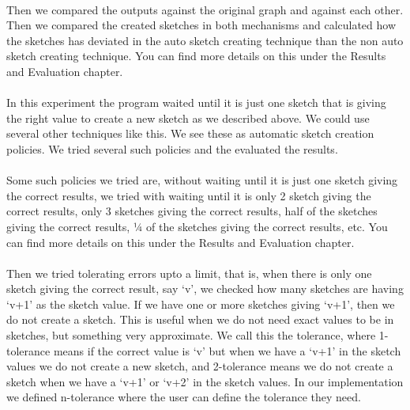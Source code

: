 \documentclass[12pt]{report}
\numberwithin{figure}{section}
\numberwithin{table}{section}
\begin{document}
\paragraph{}

Then we compared the outputs against the original graph and against each other. Then we compared the created sketches in both mechanisms and calculated how the sketches has deviated in the auto sketch creating technique  than the non auto sketch creating technique. You can find more details on this under the Results and Evaluation chapter. 

\paragraph{}

In this experiment the program waited until it is just one sketch that is giving the right value to create a new sketch as we described above. We could use several other techniques like this. We see these as automatic sketch creation policies. We tried several such policies and the evaluated the results. 

\paragraph{}

Some such policies we tried are, without waiting until it is just one sketch giving the correct results, we tried with waiting until it is only 2 sketch giving the correct results, only 3 sketches giving the correct results, half of the sketches giving the correct results, ¼ of the sketches giving the correct results, etc.  You can find more details on this under the Results and Evaluation chapter.

\paragraph{}

Then we tried tolerating errors upto a limit, that is, when there is only one sketch giving the correct result, say ‘v’, we checked how many sketches are having ‘v+1’ as the sketch value. If we have one or more sketches giving ‘v+1’, then we do not create a sketch. This is useful when we do not need exact values to be in sketches, but something very approximate. We call this the tolerance, where 1-tolerance means if the correct value is ‘v’ but when we have a ‘v+1’ in the sketch values we do not create a new sketch, and 2-tolerance means we do not create a sketch when we have a ‘v+1’ or ‘v+2’ in the sketch values. In our implementation we defined n-tolerance where the user can define the tolerance they need. 
\end{document}
